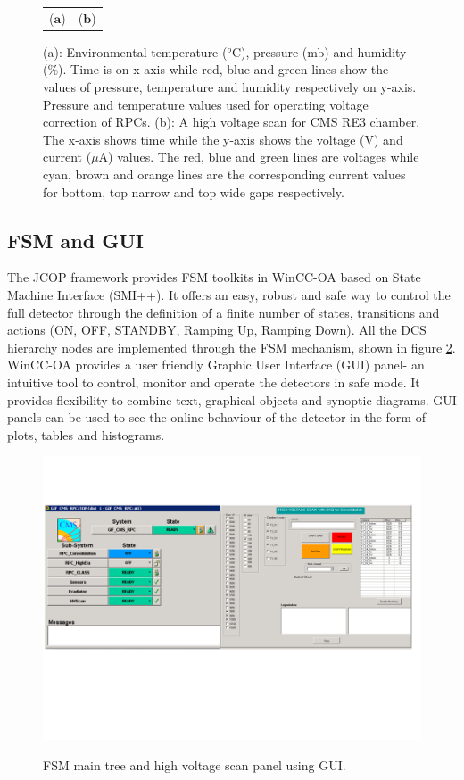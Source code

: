\begin{figure}[htp]
\begin{tabular}{cc}
   ($\mathbf{a}$)\qquad&($\mathbf{b}$)\qquad\\
\end{tabular}
\caption{(a): Environmental temperature ($^o$C), pressure (mb) and humidity (\%). Time is on x-axis while red, blue and green lines show the values of pressure, temperature and humidity respectively on y-axis. Pressure and temperature values used for operating voltage correction of RPCs. (b): A high voltage scan for CMS RE3 chamber. The x-axis shows time while the y-axis shows the voltage (V) and current ($\mu$A) values. The red, blue and green lines are voltages while cyan, brown and orange lines are the corresponding current values for bottom, top narrow and top wide gaps respectively.}\label{scan_temp}
\end{figure}

\subsection{FSM and GUI}
The JCOP framework provides FSM toolkits in WinCC-OA based on State Machine Interface (SMI++). It offers an easy, robust and safe way to control the full detector through the definition of a finite number of states, transitions and actions (ON, OFF, STANDBY, Ramping Up, Ramping Down). All the DCS hierarchy nodes are implemented through the FSM mechanism, shown in figure \ref{fig:gui}.\\
WinCC-OA provides a user friendly Graphic User Interface (GUI) panel- an intuitive tool to control, monitor and operate the detectors in safe mode. It provides flexibility to combine text, graphical objects and synoptic diagrams. GUI panels can be used to see the online behaviour of the detector in the form of plots, tables and histograms. 

\begin{figure}[htp]
\centering
\includegraphics[scale=0.46,trim=0 175 10 80,clip]{fig/wincc/GUI2.png}\\
 \caption{FSM main tree and high voltage scan panel using GUI.}
\label{fig:gui}
\end{figure}
